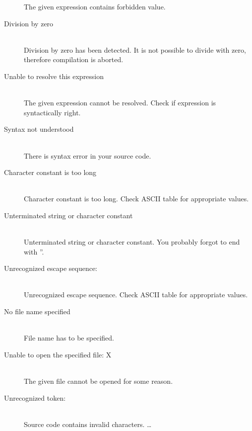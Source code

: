 \begin{description}
                    The given expression contains forbidden value.
                    \item[Division by zero ] \hfill \\
                    Division by zero has been detected. It is not possible to divide with zero, therefore compilation is aborted.
                    \item[Unable to resolve this expression ] \hfill \\
                    The given expression cannot be resolved. Check if expression is syntactically right.
                    \item[Syntax not understood ] \hfill \\
                    There is syntax error in your source code.
                    \item[Character constant is too long ] \hfill \\
                    Character constant is too long. Check ASCII table for appropriate values.
                    \item[Unterminated string or character constant ] \hfill \\
                    Unterminated string or character constant. You probably forgot to end with ''.
                    \item[Unrecognized escape sequence: ] \hfill \\
                    Unrecognized escape sequence. Check ASCII table for appropriate values.
                    \item[No file name specified ] \hfill \\                                                                            %
                    File name has to be specified.
                    \item[Unable to open the specified file: X] \hfill \\
                    The given file cannot be opened for some reason.
                    \item[Unrecognized token:  ] \hfill \\                    %
                    Source code contains invalid characters.
                    \ldots
                    \end{description}

